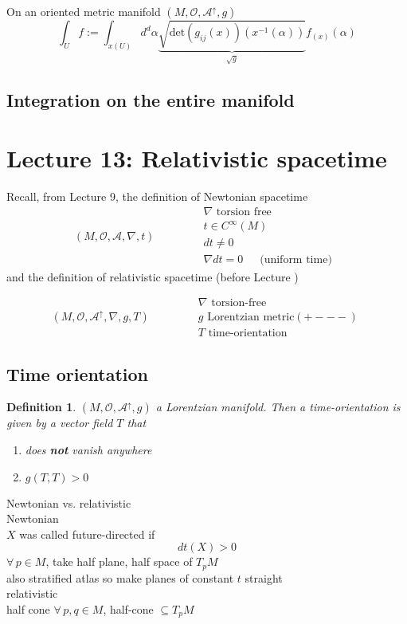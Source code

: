\documentclass[10pt, twoside]{amsart}
\newtheorem{definition}{Definition}
\begin{document}
\begin{multicols*}{2}
On an oriented metric manifold $(M,\mathcal{O}, \mathcal{A}^{\uparrow}, g)$
\[
\int_Uf:= \int_{x(U)} d^d\alpha  \underbrace{  \sqrt{ \text{det}(g_{ij}(x))(x^{-1}(\alpha)) } }_{\sqrt{g}}  f_{(x)}(\alpha)
\]

\subsection{Integration on the entire manifold}

\section{Lecture 13: Relativistic spacetime}

Recall, from Lecture 9, the definition of Newtonian spacetime
\[
(M, \mathcal{O}, \mathcal{A}, \nabla, t) \quad \quad \quad \, \begin{aligned}
& \nabla \text{ torsion free } \\
& t \in C^{\infty}(M) \\ 
& dt \neq 0 \\
& \nabla dt = 0   \quad \, \text{ (uniform time) }
\end{aligned}
\]
and the definition of relativistic spacetime (before Lecture )


\[
(M, \mathcal{O}, \mathcal{A}^{\uparrow}, \nabla, g, T ) \quad \quad \quad \, \begin{aligned}
& \nabla \text{ torsion-free } \\
& g \text{ Lorentzian metric} (+---) \\ 
& T \text{ time-orientation }
\end{aligned}
\]

\subsection{Time orientation}

\begin{definition}
  $(M,\mathcal{O},\mathcal{A}^{\uparrow},g)$ a Lorentzian manifold.  Then a time-orientation is given by a vector field $T$ that 
\begin{enumerate}
\item[(i)] does \textbf{not} vanish anywhere 
\item[(ii)] $g(T,T)>0$
\end{enumerate}
\end{definition}

Newtonian vs. relativistic \\
Newtonian \\
$X$ was called future-directed if 
\[
dt(X) >0
\]
$\forall \, p \in M$, take half plane, half space of $T_pM$ \\
also stratified atlas so make planes of constant $t$ straight \\
relativistic \\
half cone $\forall \, p, q \in M$, half-cone $\subseteq T_pM$ \\


\end{multicols*}
\end{document}
